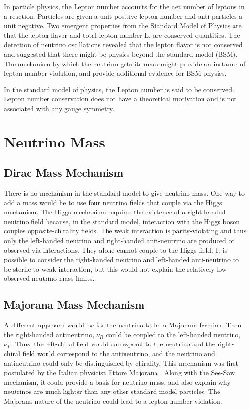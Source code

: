 In particle physics, the Lepton number accounts for the net number of leptons in a reaction. Particles are given a unit positive lepton number and anti-particles a unit negative. Two emergent properties from the Standard Model of Physics are that the lepton flavor and total lepton number L, are conserved quantities. The detection of neutrino oscillations revealed that the lepton flavor is not conserved and suggested that there might be physics beyond the standard model (BSM). The mechanism by which the neutrino gets its mass might provide an instance of lepton number violation, and provide additional evidence for BSM physics.

In the standard model of physics, the Lepton number is said to be conserved. Lepton number conservation does not have a theoretical motivation and is not associated with any gauge symmetry. 
\section{Neutrino Mass}

\subsection{Dirac Mass Mechanism}
There is no mechanism in the standard model to give neutrino mass. One way to add a mass would be to use four neutrino fields that couple via the Higgs mechanism. The Higgs mechanism requires the existence of a right-handed neutrino field because, in the standard model, interaction with the Higgs boson couples opposite-chirality fields. The weak interaction is parity-violating and thus only the left-handed neutrino and right-handed anti-neutrino are produced or observed via interactions. They alone cannot couple to the Higgs field. It is possible to consider the right-handed neutrino and left-handed anti-neutrino to be sterile to weak interaction, but this would not explain the relatively low observed neutrino mass limits.

\subsection{Majorana Mass Mechanism}
A different approach would be for the neutrino to be a Majorana fermion. Then the right-handed antineutrino, $\bar{\nu_R}$ could be coupled to the left-handed neutrino, $\nu_L$. Thus, the left-chiral field would correspond to the neutrino and the right-chiral field would correspond to the antineutrino, and the neutrino and antineutrino could only be distinguished by chirality. This mechanism was first postulated by the Italian physicist Ettore Majorana \cite{Majorana_1937}. Along with the See-Saw mechanism, it could provide a basis for neutrino mass, and also explain why neutrinos are much lighter than any other standard model particles. The Majorana nature of the neutrino could lead to a lepton number violation.


